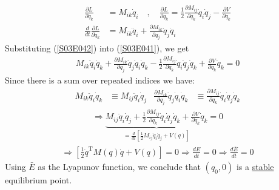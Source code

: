 \begin{solution}
\begin{align}\label{S03E042}
		\frac{\partial L}{\partial \dot{q}_k} &= M_{ik}\dot{q}_i \quad , \quad \frac{\partial L}{\partial q_k} = \frac{1}{2} \frac{\partial M_{ij}}{\partial q_k}\dot{q}_i\dot{q}_j - \frac{\partial V}{\partial q_k} \\
		\frac{d}{dt} \frac{\partial L}{\partial \dot{q}_k} &= M_{ik}\ddot{q}_i + \frac{\partial M_{ik}}{\partial q_j}\dot{q}_j\dot{q}_i
\end{align}
Substituting (\ref{S03E042}) into (\ref{S03E041}), we get
\begin{align}
	M_{ik} \ddot{q}_i\dot{q}_k + \frac{\partial M_{ik}}{\partial q_j}\dot{q}_j\dot{q}_i\dot{q}_k - \frac{1}{2}\frac{\partial M_{ij}}{\partial q_k}\dot{q}_i\dot{q}_j\dot{q}_k + \frac{\partial V}{\partial q_k}\dot{q}_k = 0
\end{align}
Since there is a sum over repeated indices we have:
\begin{align}
	M_{ik}\ddot{q}_i\dot{q}_k &\equiv M_{ij}\ddot{q}_i\dot{q}_j & \frac{\partial M_{ik}}{\partial q_j}\dot{q}_j\dot{q}_i\dot{q}_k &\equiv \frac{\partial M_{ij}}{\partial q_k}\dot{q}_i\dot{q}_j\dot{q}_k
\end{align}
\begin{align}
	\Longrightarrow \underbrace{M_{ij}\ddot{q}_i\dot{q}_j + \frac{1}{2} \frac{\partial M_{ij}}{\partial q_k}\dot{q}_i\dot{q}_j\dot{q}_k + \frac{\partial V}{\partial q_k}\dot{q}_k}_{ \displaystyle =\frac{d}{dt}\left[ \frac{1}{2}M_{ij}\dot{q}_i\dot{q}_j+V(q) \right]} = 0
\end{align}
\begin{align}
	\Longrightarrow \left[ \frac{1}{2}\dot{q}^\text{T}M(q)\dot{q} + V(q) \right] = 0 \Longrightarrow \frac{dE}{dt}=0 \Longrightarrow \frac{d\bar{E}}{dt}=0
\end{align}
Using $\bar{E}$ as the Lyapunov function, we conclude that $(q_0,0)$ is a \underline{stable} equilibrium point.
\end{solution}


